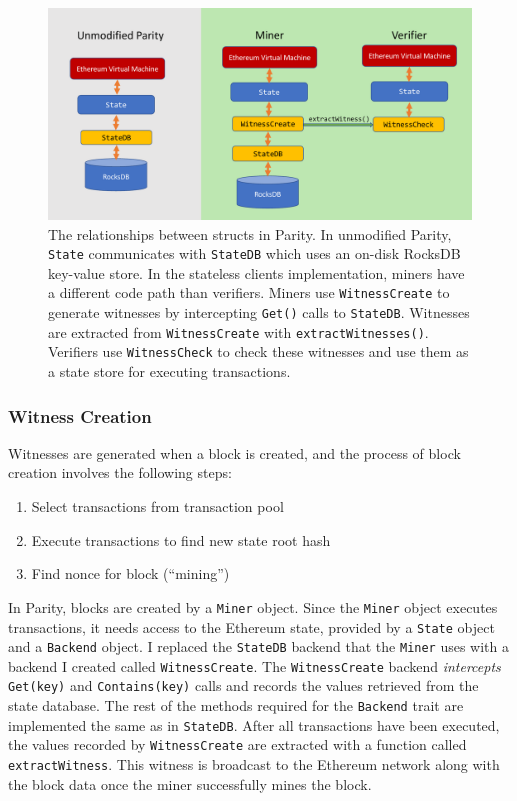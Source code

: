 \documentclass[12pt]{article}
\begin{document}
\begin{figure}[H]
  \centering
  \includegraphics[width=\textwidth]{../figures/implementation/code_layout.pdf}
  \caption{The relationships between structs in Parity. In unmodified Parity, \texttt{State} communicates with \texttt{StateDB} which uses an on-disk RocksDB key-value store. In the stateless clients implementation, miners have a different code path than verifiers. Miners use \texttt{WitnessCreate} to generate witnesses by intercepting \texttt{Get()} calls to \texttt{StateDB}. Witnesses are extracted from \texttt{WitnessCreate} with \texttt{extractWitnesses()}. Verifiers use \texttt{WitnessCheck} to check these witnesses and use them as a state store for executing transactions.}
  \label{fig:parityrelationships}
\end{figure}

\subsubsection{Witness Creation}

Witnesses are generated when a block is created, and the process of block creation involves the following steps:
\begin{enumerate}
  \item Select transactions from transaction pool
  \item Execute transactions to find new state root hash
  \item Find nonce for block (``mining'')
\end{enumerate}
In Parity, blocks are created by a \texttt{Miner} object. Since the \texttt{Miner} object executes transactions, it needs access to the Ethereum state, provided by a \texttt{State} object and a \texttt{Backend} object. I replaced the \texttt{StateDB} backend that the \texttt{Miner} uses with a backend I created called \texttt{WitnessCreate}. The \texttt{WitnessCreate} backend \emph{intercepts} \texttt{Get(key)} and \texttt{Contains(key)} calls and records the values retrieved from the state database. The rest of the methods required for the \texttt{Backend} trait are implemented the same as in \texttt{StateDB}. After all transactions have been executed, the values recorded by \texttt{WitnessCreate} are extracted with a function called \texttt{extractWitness}. This witness is broadcast to the Ethereum network along with the block data once the miner successfully mines the block.
\end{document}

